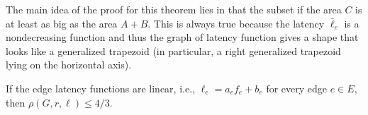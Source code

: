 \begin{proof-sketch}
    The main idea of the proof for this theorem lies in that the subset if the area $C$ is at least as big as the area $A+B$. This is always true because the latency $\bar{\ell}_e$ is a nondecreasing function and thus the graph of latency function gives a shape that looks like a generalized trapezoid (in particular, a right generalized trapezoid lying on the horizontal axis). 
\end{proof-sketch}

\begin{theorem}
    If the edge latency functions are linear, i.e., $\ell_e = a_ef_e + b_e$ for every edge $e \in E$, then $\rho(G, r,\ell) \leq 4/3$.
    \label{thm:linear}
\end{theorem}

